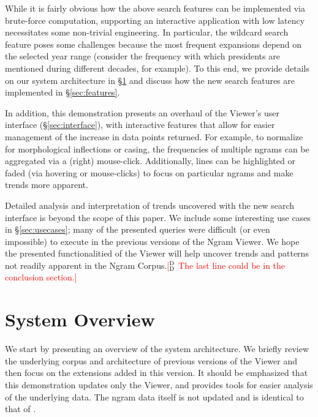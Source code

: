 \documentclass[11pt,a4paper]{article}
\newcommand{\ddcomment}[1]{\textcolor{red}{[$^{\textsc{D}}_{\textsc{D}}$ #1]}}
\begin{document}
While it is fairly obvious how the above search features can be implemented via brute-force computation, supporting an interactive application with low latency necessitates some non-trivial engineering. In particular, the wildcard search feature poses some challenges because the most frequent expansions depend on the selected year range (consider the frequency with which presidents are mentioned during different decades, for example). To this end, we provide details on our system architecture in \S\ref{sec:overview}  and discuss how the new search features are implemented in \S\ref{sec:features}.

In addition, this demonstration presents an overhaul of the Viewer's user interface (\S\ref{sec:interface}), with interactive features that allow for easier management of the increase in data points returned. For example, to normalize for morphological inflections or casing, the frequencies of multiple ngrams can be aggregated via a (right) mouse-click. Additionally, lines can be highlighted or faded (via hovering or mouse-clicks) to focus on particular ngrams and make trends more apparent.

Detailed analysis and interpretation of trends uncovered with the new search interface is beyond the scope of this paper. We include some interesting use cases in \S\ref{sec:usecases}; many of the presented queries were difficult (or even impossible) to execute in the previous versions of the Ngram Viewer. We hope the presented functionalitied of the Viewer will help uncover trends and patterns not readily apparent in the Ngram Corpus.\ddcomment{The last line could be in the conclusion section.}

\section{System Overview}
\label{sec:overview}

We start by presenting an overview of the system architecture. We briefly review the underlying corpus and architecture of previous versions of the Viewer \cite{culturomics,lin2012syntactic} and then focus on the extensions added in this version. It should be emphasized that this demonstration updates only the Viewer, and provides tools for easier analysis of the underlying data. The ngram data itself is not updated and is identical to that of .
\end{document}
